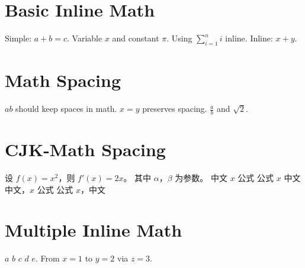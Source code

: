 \documentclass{article}
\begin{document}
\section{Basic Inline Math}
Simple: $a+b=c$.
Variable $x$ and constant $\pi$.
Using $ \sum_{i=1}^{n} i $ inline.
Inline: $x + y$.

\section{Math Spacing}
$a  b$ should keep spaces in math.
$x   =   y$ preserves spacing.
$\frac{a}{b}$ and $\sqrt{2}$.

\section{CJK-Math Spacing}
设 $f(x)=x^{2}$，则 $f'(x)=2x$。
其中 $\alpha$，$\beta$ 为参数。
中文 $x$ 公式
公式 $x$ 中文
中文，$x$ 公式
公式 $x$，中文

\section{Multiple Inline Math}
$a$ $b$ $c$ $d$ $e$.
From $x=1$ to $y=2$ via $z=3$.
\end{document}
